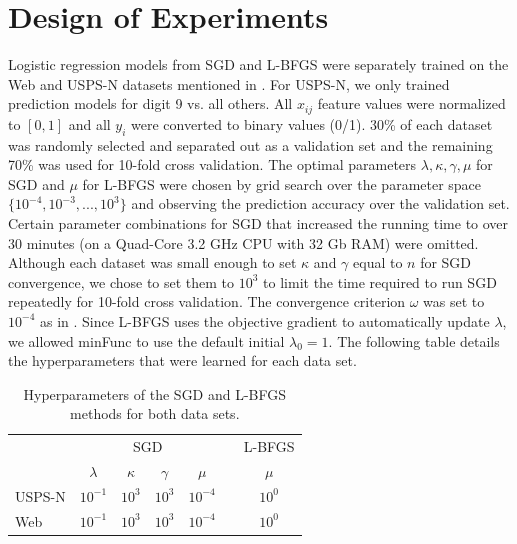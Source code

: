 \documentclass[10pt]{article}
\begin{document}
\section{Design of Experiments}
\label{sec:experiments}

Logistic regression models from SGD and L-BFGS were separately trained on the Web and USPS-N datasets mentioned in \cite{t-logistic}. For USPS-N, we only trained prediction models for digit 9 vs. all others. All $x_{ij}$ feature values were normalized to $[0,1]$ and all $y_i$ were converted to binary values (0/1). 30\% of each dataset was randomly selected and separated out as a validation set and the remaining 70\% was used for 10-fold cross validation. The optimal parameters $\lambda, \kappa, \gamma, \mu$ for SGD and $\mu$ for L-BFGS were chosen by grid search over the parameter space $\{10^{-4},10^{-3},...,10^{3}\}$ and observing the prediction accuracy over the validation set. Certain parameter combinations for SGD that increased the running time to over 30 minutes (on a Quad-Core 3.2 GHz CPU with 32 Gb RAM) were omitted. Although each dataset was small enough to set $\kappa$ and $\gamma$ equal to $n$ for SGD convergence, we chose to set them to $10^{3}$ to limit the time required to run SGD repeatedly for 10-fold cross validation. The convergence criterion $\omega$ was set to $10^{-4}$ as in \cite{t-logistic}. Since L-BFGS uses the objective gradient to automatically update $\lambda$, we allowed minFunc to use the default initial $\lambda_0 = 1$. The following table details the hyperparameters that were learned for each data set.

\begin{table}[htb!]
\centering
\begin{tabular}{lcccccc}
& \multicolumn{4}{c}{SGD} & & L-BFGS\\
\cline{2-5}
\cline{7-7}
 & $\lambda$ & $\kappa$ & $\gamma$ & $\mu$ & & $\mu$\\
USPS-N & $10^{-1}$ & $10^{3}$ & $10^{3}$ & $10^{-4}$ & & $10^{0}$\\
Web & $10^{-1}$ & $10^{3}$ & $10^{3}$ & $10^{-4}$ & & $10^{0}$\\
\end{tabular}
\caption{Hyperparameters of the SGD and L-BFGS methods for both data sets.}
\end{table}
\end{document}
